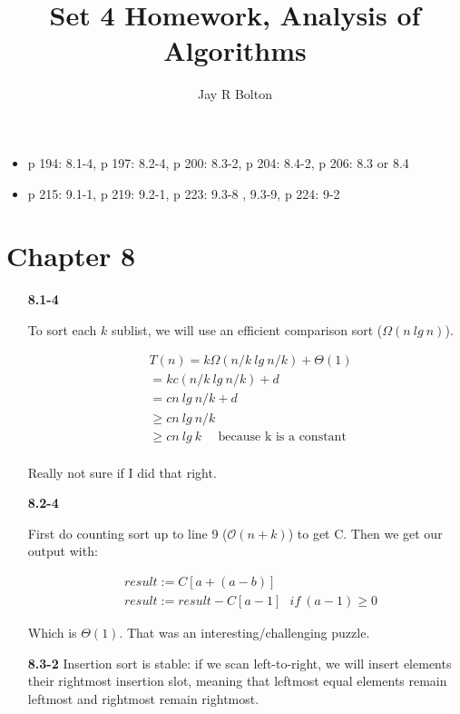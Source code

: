 \documentclass{article}
\title{Set 4 Homework, Analysis of Algorithms}
\author{Jay R Bolton}
\begin{document}
\maketitle

\begin{itemize}
\item p 194: 8.1-4, p 197: 8.2-4, p 200: 8.3-2, p 204: 8.4-2, p 206: 8.3 or 8.4
\item p 215: 9.1-1, p 219: 9.2-1, p 223: 9.3-8 , 9.3-9, p 224: 9-2 
\end{itemize}

\section*{Chapter 8}

\begin{enumerate}

\item[\textbf{8.1-4}]

To sort each $k$ sublist, we will use an efficient comparison sort ($\Omega(n\ lg\ n)$). 

\begin{align*}
& T(n) = k\Omega(n/k\ lg\ n/k) + \Theta(1) \\
& = kc(n/k\ lg\ n/k) + d \\
& = cn\ lg\ n/k + d \\
& \geq cn\ lg\ n/k \\
& \geq cn\ lg\ k \ \ \ \ \ \ \text{because k is a constant} \\
\end{align*}

Really not sure if I did that right.

\item[\textbf{8.2-4}]

First do counting sort up to line 9 ($\mathcal{O}(n + k)$) to get C. Then we get our output with:

\begin{align*}
& result := C[a + (a-b)] \\
& result := result - C[a-1]\ \ \ if\ (a-1) \geq 0
\end{align*}

Which is $\Theta(1)$. That was an interesting/challenging puzzle.

\item[\textbf{8.3-2}]
	Insertion sort is stable: if we scan left-to-right, we will insert elements their rightmost insertion slot, meaning that leftmost equal elements remain leftmost and rightmost remain rightmost.


\end{enumerate}
\end{document}

